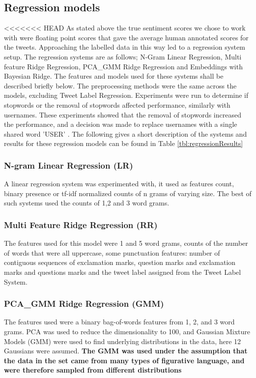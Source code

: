 \documentclass[11pt,letterpaper]{article}
\begin{document}
\subsection{Regression models}
<<<<<<< HEAD
As stated above the true sentiment scores we chose to work with were floating point scores that gave the average human annotated scores for the tweets. Approaching the labelled data in this way led to a regression system setup.
The regression systems are as follows; N-Gram Linear Regression, Multi feature  Ridge Regression, PCA\_GMM Ridge Regression and Embeddings with Bayesian Ridge. The features and models used for these systems shall be described briefly below. The preprocessing methods were the same across the models, excluding Tweet Label Regression. Experiments were run to determine if stopwords or the removal of stopwords affected performance, similarly with usernames. These experiments showed that the removal of stopwords increased the performance, and a decision was made to replace usernames with a single shared word 'USER' .  The following gives a short description of the systems and results for these regression models can be found in Table \ref{tbl:regressionResults}

\subsubsection{N-gram Linear Regression (LR)}
\label{subsec:LR}
A linear regression system was experimented with, it used as features count, binary presence or tf-idf normalized counts of  n grams of varying size. The best of such systems used the counts of 1,2 and 3 word grams. 

\subsubsection{Multi Feature Ridge Regression (RR)}
\label{subsec:RR}
The features used for this model were 1 and 5 word grams, counts of the number of words that were all uppercase, some punctuation features: number of contiguous sequences of exclamation marks, question marks and exclamation marks and questions marks and the tweet label assigned from the Tweet Label System.

\subsubsection{PCA\_GMM Ridge Regression (GMM)}
\label{subsec:GMM}
The features used were a binary bag-of-words features from 1, 2, and 3  word grams. PCA was used to reduce the dimensionality to 100, and Gaussian Mixture Models (GMM) were used to find underlying distributions in the data, here 12 Gaussians were assumed.{ \bf  The GMM was used under the assumption that the data in the set came from many types of figurative language, and were therefore sampled from different distributions}
\end{document}
